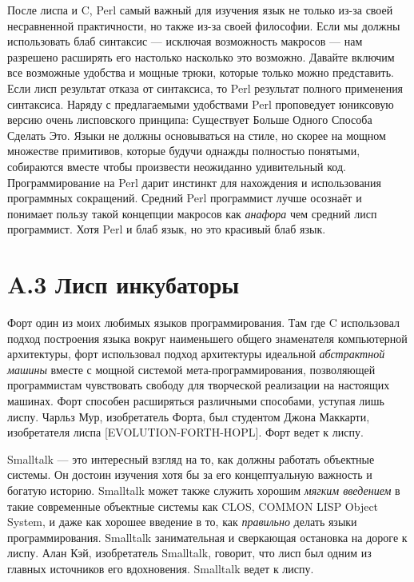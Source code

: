 После лиспа и C, Perl самый важный для изучения язык не только из-за своей несравненной практичности, но также из-за своей философии. Если мы должны использовать блаб синтаксис --- исключая возможность макросов --- нам разрешено расширять его настолько насколько это возможно. Давайте включим все возможные удобства и мощные трюки, которые только можно представить. Если лисп результат отказа от синтаксиса, то Perl результат полного применения синтаксиса. Наряду с предлагаемыми удобствами Perl проповедует юниксовую версию очень лисповского принципа: Существует Больше Одного Способа Сделать Это. Языки не должны основываться на стиле, но скорее на мощном множестве примитивов, которые будучи однажды полностью понятыми, собираются вместе чтобы произвести неожиданно удивительный код. Программирование на Perl дарит инстинкт для нахождения и использования программных сокращений. Средний Perl программист лучше осознаёт и понимает пользу такой концепции макросов как \emph{анафора} чем средний лисп программист. Хотя Perl и блаб язык, но это красивый блаб язык.

\section*{A.3 Лисп инкубаторы}

Форт один из моих любимых языков программирования. Там где C использовал подход построения языка вокруг наименьшего общего знаменателя компьютерной архитектуры, форт использовал подход архитектуры идеальной \emph{абстрактной машины} вместе с мощной системой мета-программирования, позволяющей программистам чувствовать свободу для творческой реализации на настоящих машинах. Форт способен расширяться различными способами, уступая лишь лиспу. Чарльз Мур, изобретатель Форта, был студентом Джона Маккарти, изобретателя лиспа [EVOLUTION-FORTH-HOPL]. Форт ведет к лиспу.

Smalltalk --- это интересный взгляд на то, как должны работать объектные системы. Он достоин изучения хотя бы за его концептуальную важность и богатую историю. Smalltalk может также служить хорошим \emph{мягким введением} в такие современные объектные системы как CLOS, COMMON LISP Object System, и даже как хорошее введение в то, как \emph{правильно} делать языки программирования. Smalltalk занимательная и сверкающая остановка на дороге к лиспу. Алан Кэй, изобретатель Smalltalk, говорит, что лисп был одним из главных источников его вдохновения. Smalltalk ведет к лиспу.

